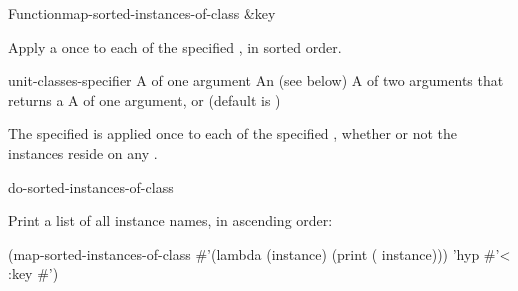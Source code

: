 \documentclass[10pt,twoside,english,pdftex]{article}
\begin{document}
\begin{functiondoc}{Function}{map-sorted-instances-of-class}%
{ \&key }
%
%

\fnsyntax

\fnpurpose Apply a  once to each 
of the specified , in sorted order.

\fnpackage {}

\fnmodule {}

\fnargs
\begin{args}{unit-classes-specifier}
\arg[function] A  of one argument
 An 
(see below)
\arg[predicate] A  of two arguments that returns a
\arg[key] A  of one argument, or \nil{} (default is \nil)
\end{args}

\fndsyntax
\unitclassesspec
\subclassingspec

\fndescription  The specified  is applied once to each
 of the specified , whether
or not the instances reside on any .

\begin{alsos}{do-sorted-instances-of-class}
\end{alsos}

\fnexample
Print a list of all  instance names, in ascending order:
\begin{example}
  (map-sorted-instances-of-class 
     #'(lambda (instance)
         (print ( instance)))
     'hyp #'< :key #')
\end{example} 

\end{functiondoc}

\end{document}
